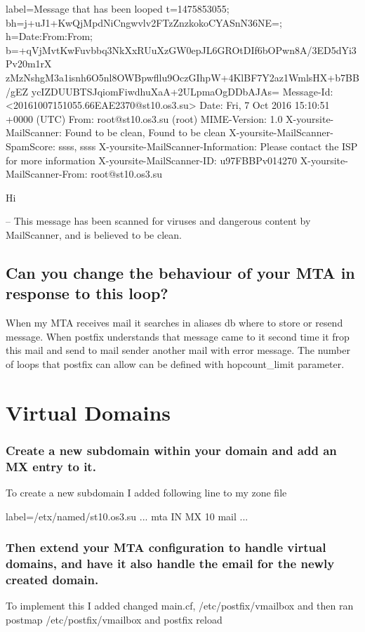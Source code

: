 \documentclass[a4paper,11pt]{article}
\begin{document}
\begin{bashcode*}{label=Message that has been looped}
  t=1475853055; bh=j+uJ1+KwQjMpdNiCngwvlv2FTzZnzkokoCYASnN36NE=;
  h=Date:From:From;
  b=+qVjMvtKwFuvbbq3NkXxRUuXzGW0epJL6GROtDIf6bOPwn8A/3ED5dYi3Pv20m1rX
   zMzNshgM3a1isnh6O5nl8OWBpwfllu9OczGIhpW+4KlBF7Y2az1WmlsHX+b7BB/gEZ
   ycIZDUUBTSJqiomFiwdhuXaA+2ULpmaOgDDbAJAs=
Message-Id: <20161007151055.66EAE2370@st10.os3.su>
Date: Fri,  7 Oct 2016 15:10:51 +0000 (UTC)
From: root@st10.os3.su (root)
MIME-Version: 1.0
X-yoursite-MailScanner: Found to be clean, Found to be clean
X-yoursite-MailScanner-SpamScore: ssss, ssss
X-yoursite-MailScanner-Information: Please contact the ISP for more information
X-yoursite-MailScanner-ID: u97FBBPv014270
X-yoursite-MailScanner-From: root@st10.os3.su

Hi

-- 
This message has been scanned for viruses and
dangerous content by MailScanner, and is
believed to be clean.
\end{bashcode*}

\subsection{Can you change the behaviour of your MTA in response to this loop?}
When my MTA receives mail it searches in aliases db where to store or resend message. When postfix understands that message came to it second time it frop this mail and send to mail sender another mail with error message. The number of loops that postfix can allow can be defined with hopcount\_limit parameter.

\section{Virtual Domains}
\addtocounter{subsection}{3}
\subsubsection{Create a new subdomain within your domain and add an MX entry to it.}
To create a new subdomain I added following line to my zone file
\begin{bashcode*}{label=/etx/named/st10.os3.su}
...
mta   IN  MX  10  mail
...
\end{bashcode*}

\subsubsection{Then extend your MTA configuration to handle virtual domains, and have it also handle the email for the newly created domain.}
To implement this I added changed main.cf, /etc/postfix/vmailbox and then ran postmap /etc/postfix/vmailbox and postfix reload
\end{document}
